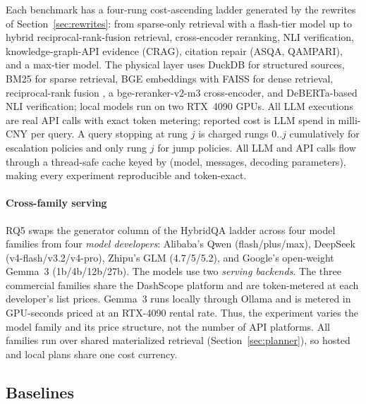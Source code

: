 Each benchmark has a four-rung cost-ascending ladder generated by the
rewrites of Section~\ref{sec:rewrites}: from sparse-only retrieval with
a flash-tier model up to hybrid reciprocal-rank-fusion retrieval,
cross-encoder reranking, NLI verification, knowledge-graph-API evidence
(CRAG), citation repair (ASQA, QAMPARI), and a max-tier model. The
physical layer uses DuckDB \citep{raasveldt2019duckdb} for structured
sources, BM25 \citep{robertson2009bm25} for sparse retrieval, BGE
embeddings \citep{xiao2023bge} with FAISS \citep{johnson2019faiss} for
dense retrieval, reciprocal-rank fusion \citep{cormack2009rrf}, a
bge-reranker-v2-m3 cross-encoder, and DeBERTa-based NLI verification;
local models run on two RTX~4090 GPUs. All LLM executions are real API
calls with exact token metering; reported cost is LLM spend in
milli-CNY per query. A query stopping at rung $j$ is charged rungs
$0..j$ cumulatively for escalation policies and only rung $j$ for jump
policies. All LLM and API calls flow through a thread-safe cache keyed
by (model, messages, decoding parameters), making every experiment
reproducible and token-exact.

\paragraph{Cross-family serving}
RQ5 swaps the generator column of the HybridQA ladder across four model
families from four \emph{model developers}: Alibaba's Qwen
(flash/plus/max), DeepSeek (v4-flash/v3.2/v4-pro), Zhipu's GLM
(4.7/5/5.2), and Google's open-weight Gemma~3 (1b/4b/12b/27b). The
models use two \emph{serving backends}. The three commercial families
share the DashScope platform and are token-metered at each developer's
list prices. Gemma~3 runs locally through Ollama and is metered in
GPU-seconds priced at an RTX-4090 rental rate. Thus, the experiment
varies the model family and its price structure, not the number of API
platforms. All families run over shared materialized retrieval
(Section~\ref{sec:planner}), so hosted and local plans share one cost
currency.

\subsection{Baselines}
\label{sec:baselines}

